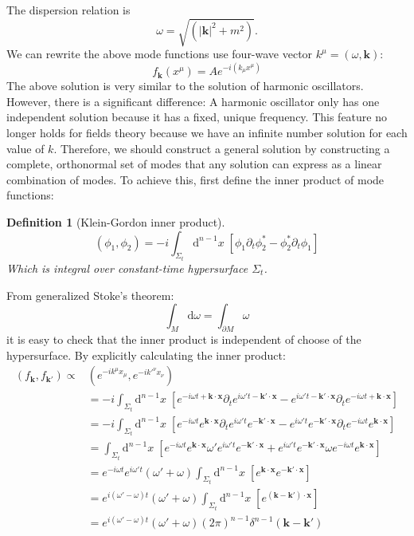 \documentclass[12pt]{article}
\numberwithin{equation}{section}
\theoremstyle{1style}
\newtheorem{definition}[equation]{Definition}
\newcommand{\p}{\partial}
\newcommand{\id}{\mathrm{d}}
\begin{document}
The dispersion relation is \[\omega = \sqrt{(\mathbf{|k|}^2 + m^2 )}.\]
We can rewrite the above mode functions use four-wave vector \(k^{\mu}=(\omega,\mathbf{k})\):
\begin{equation}\label{112}
  f_{\mathbf{k}}(x^{\mu})= Ae^{-i(k_\mu x^\mu)}
\end{equation}
The above solution is very similar to the solution of harmonic oscillators. However, there is a significant difference:
A harmonic oscillator only has one independent solution because it has a fixed, unique frequency.
This feature no longer holds for fields theory because we have an infinite number solution for each value of \(k\).
Therefore, we should construct a general solution by constructing a complete, orthonormal set of modes that any solution
can express as a linear combination of modes.
To achieve this, first define the inner product of mode functions:
\begin{definition}[Klein-Gordon inner product]\label{kgi}
  \[(\phi_1,\phi_2)=-i\int_{\Sigma_t}\id^{n-1}x\;\left[\phi_1\p_t\phi^*_2-\phi_2^*\p_t\phi_1\right]\]
  Which is integral over constant-time hypersurface \(\Sigma_t\).
\end{definition}
From generalized Stoke's theorem:\[\int_{M}\id\omega=\int_{\p M}\omega\]
\hfill \break
it is easy to check that the inner product is independent of choose of the hypersurface.
By explicitly calculating the inner product:
\begin{align}
  \left(f_{\mathbf{k}},f_{\mathbf{k}'}\right)\propto
   & \left(e^{-ik^{\mu}x_{\mu}},e^{-ik'^{\nu}x_{\nu}}\right)                           \\
   & =-i\int_{\Sigma_t}\id^{n-1}x\;\left[e^{-i\omega t+\mathbf{k}\cdot\mathbf{x}}
  \p_{t}e^{i\omega' t-\mathbf{k'}\cdot\mathbf{x}}-e^{i\omega' t-\mathbf{k'}\cdot\mathbf{x}}
  \p_{t}e^{-i\omega t+\mathbf{k}\cdot\mathbf{x}}\right]                                \\
   & = -i\int_{\Sigma_t}\id^{n-1}x\;\left[e^{-i\omega t} e^{\mathbf{k}\cdot\mathbf{x}}
  \p_{t}e^{i\omega' t}e^{-\mathbf{k'}\cdot\mathbf{x}}-e^{i\omega' t}e^{-\mathbf{k'}\cdot\mathbf{x}}
  \p_{t}e^{-i\omega t}e^{\mathbf{k}\cdot\mathbf{x}}\right]                             \\
   & =\int_{\Sigma_t}\id^{n-1}x\;\left[e^{-i\omega t} e^{\mathbf{k}\cdot\mathbf{x}}
  \omega' e^{i\omega' t}e^{-\mathbf{k'}\cdot\mathbf{x}}+e^{i\omega' t}e^{-\mathbf{k'}\cdot\mathbf{x}}
  \omega e^{-i\omega t}e^{\mathbf{k}\cdot\mathbf{x}}\right]                            \\
   & =  e^{-i\omega t}e^{i\omega' t}(\omega'+\omega)\int_{\Sigma_t}\id^{n-1}x\;
  \left[ e^{\mathbf{k}\cdot\mathbf{x}}e^{-\mathbf{k'}\cdot\mathbf{x}}\right]           \\
   & =   e^{i(\omega'-\omega)t}(\omega'+\omega)\int_{\Sigma_t}\id^{n-1}x\;
  \left[ e^{(\mathbf{k}-\mathbf{k'})\cdot\mathbf{x}}\right]                            \\
   & =  e^{i(\omega'-\omega)t}(\omega'+\omega)(2\pi)^{n-1}
  \delta^{n-1}\left(\mathbf{k}-\mathbf{k'}\right)
\end{align}
\end{document}
